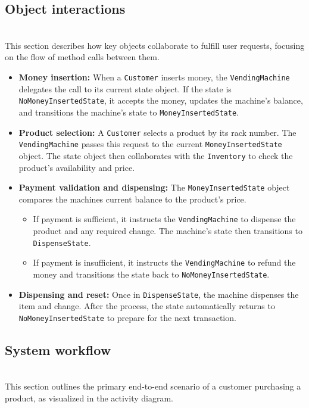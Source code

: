 \subsection{Object interactions}\label{1w9GeQp10VXbtONmzs_bo}
\\
This section describes how key objects collaborate to fulfill user requests, focusing on the flow of method calls between them.

\begin{itemize}
\item
\protect{}\label{ZpE5R3XJRPYoebXpipJDd}
\textbf{Money insertion:} When a \texttt{Customer} inserts money, the \texttt{VendingMachine} delegates the call to its current state object. If the state is \texttt{NoMoneyInsertedState}, it accepts the money, updates the machine's balance, and transitions the machine's state to \texttt{MoneyInsertedState}.
\item
\protect{}\label{rHRauEx0XJOgUJ69mavVr}
\textbf{Product selection:} A \texttt{Customer} selects a product by its rack number. The \texttt{VendingMachine} passes this request to the current \texttt{MoneyInsertedState} object. The state object then collaborates with the \texttt{Inventory} to check the product's availability and price.
\item
\protect{}\label{26KgRF8xEvG6bXzD3Gaj1}
\textbf{Payment validation and dispensing:} The \texttt{MoneyInsertedState} object compares the machine\textquotesingle s current balance to the product's price.

\begin{itemize}
\item
If payment is sufficient, it instructs the \texttt{VendingMachine} to dispense the product and any required change. The machine's state then transitions to \texttt{DispenseState}.
\item
If payment is insufficient, it instructs the \texttt{VendingMachine} to refund the money and transitions the state back to \texttt{NoMoneyInsertedState}.
\end{itemize}
\item
\protect{}\label{JUfoJqmOBgt861CLVj-KS}
\textbf{Dispensing and reset:} Once in \texttt{DispenseState}, the machine dispenses the item and change. After the process, the state automatically returns to \texttt{NoMoneyInsertedState} to prepare for the next transaction.
\end{itemize}

\subsection{System workflow}\label{qvlWcAX1I_sE1WprJZ_9K}
\\
This section outlines the primary end-to-end scenario of a customer purchasing a product, as visualized in the activity diagram.

